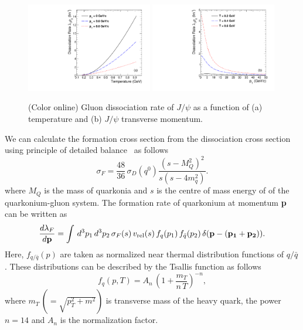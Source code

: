 \documentclass[12pt,a4paper,final]{iopart} %
\newcommand{\Jpsi}{J/\psi}
\begin{document}
\begin{figure}
\includegraphics[width=0.49\textwidth]{Fig2a_DRateVsT.pdf}
\includegraphics[width=0.49\textwidth]{Fig2b_DRateVsPt.pdf}
\caption{(Color online) Gluon dissociation rate of $\Jpsi$ as a function of (a) temperature and  
(b) $\Jpsi$ transverse momentum.}
\label{fig:DRateVsTempAndPt}
\end{figure}




We can calculate the formation cross section from the dissociation cross section
using principle of detailed balance~\cite{Thews:2000rj,Thews:2005vj} as follows
\begin{equation}
\sigma_{F} = \frac{48}{36}\,\sigma_{D}(q^0)\frac{(s-M_{Q}^2)^{2}}{s(s-4m_q^{2})}.
\end{equation}
where $M_{Q}$ is the mass of quarkonia and $s$ is the centre of mass energy of
of the quarkonium-gluon system.
The formation rate of quarkonium at momentum {\bf p} can be written as
\begin{equation}
\frac{d\lambda_{F}}{d{\rm\bf p}} = \int \,d^{3}p_1 \,d^{3}p_2 \,\sigma_{F}(s)\, v_{\rm rel}(s)\,f_{q}(p_1)\, f_{\bar{q}} (p_2)\,\delta({\rm\bf p}-( {\rm\bf p_1} + {\rm\bf p_2} )).
\end{equation}
Here, $f_{q/\bar{q}}(p)$ are taken as normalized near thermal distribution functions
of $q/\bar{q}$. These distributions can be described by the Tsallis
function as follows 
\begin{equation}
f_{q} (p,T) = A_{n}\,\left( 1+\frac{m_{T}}{n \,T} \right)^{-n},
\end{equation}
where $m_T\,(=\sqrt{p_{T}^{2}+m^{2}})$ is transverse mass of the heavy quark, the
power $n=14$ and $A_n$ is the normalization factor.
\end{document}
